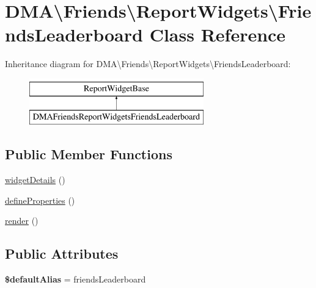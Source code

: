 \hypertarget{classDMA_1_1Friends_1_1ReportWidgets_1_1FriendsLeaderboard}{}\section{D\+M\+A\textbackslash{}Friends\textbackslash{}Report\+Widgets\textbackslash{}Friends\+Leaderboard Class Reference}
\label{classDMA_1_1Friends_1_1ReportWidgets_1_1FriendsLeaderboard}
Inheritance diagram for D\+M\+A\textbackslash{}Friends\textbackslash{}Report\+Widgets\textbackslash{}Friends\+Leaderboard\+:\begin{figure}[H]
\begin{center}
\leavevmode
\includegraphics[height=2.000000cm]{dd/dbd/classDMA_1_1Friends_1_1ReportWidgets_1_1FriendsLeaderboard}
\end{center}
\end{figure}
\subsection*{Public Member Functions}
\begin{DoxyCompactItemize}
\item 
\hyperlink{classDMA_1_1Friends_1_1ReportWidgets_1_1FriendsLeaderboard_ac5fc1d8631aca255dee64a37ddeed5f6}{widget\+Details} ()
\item 
\hyperlink{classDMA_1_1Friends_1_1ReportWidgets_1_1FriendsLeaderboard_a8a2b873a91fc33c558834423e35da4bc}{define\+Properties} ()
\item 
\hyperlink{classDMA_1_1Friends_1_1ReportWidgets_1_1FriendsLeaderboard_acc5889523847a95eb855e6041c5ef92f}{render} ()
\end{DoxyCompactItemize}
\subsection*{Public Attributes}
\begin{DoxyCompactItemize}
\item 
\hypertarget{classDMA_1_1Friends_1_1ReportWidgets_1_1FriendsLeaderboard_ab1f836744d59c96df00f1fad2cddb01f}{}{\bfseries \$default\+Alias} = \textquotesingle{}friends\+Leaderboard\textquotesingle{}\label{classDMA_1_1Friends_1_1ReportWidgets_1_1FriendsLeaderboard_ab1f836744d59c96df00f1fad2cddb01f}

\end{DoxyCompactItemize}


